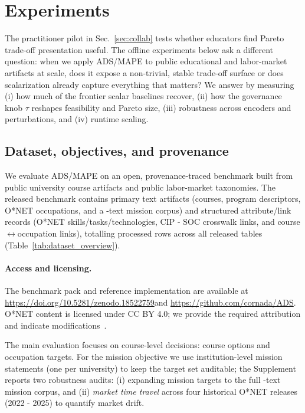 \documentclass[sigconf,review]{acmart}
\newcommand{\BenchmarkURL}{\url{https://doi.org/10.5281/zenodo.18522759}}
\newcommand{\CodeURL}{\url{https://github.com/cornada/ADS}}
\newcommand{\ADS}{\textsc{ADS}\xspace}
\newcommand{\MAPE}{\textsc{MAPE}\xspace}
\begin{document}
\section{Experiments}

\label{sec:experiments}

The practitioner pilot in Sec.~\ref{sec:collab} tests whether educators find Pareto trade-off presentation useful. The offline experiments below ask a different question: when we apply \ADS/\MAPE to public educational and labor-market artifacts at scale, does it expose a non-trivial, stable trade-off surface or does scalarization already capture everything that matters? We answer by measuring (i) how much of the frontier scalar baselines recover, (ii) how the governance knob $\tau$ reshapes feasibility and Pareto size, (iii) robustness across encoders and perturbations, and (iv) runtime scaling.

\subsection{Dataset, objectives, and provenance}
\label{subsec:data}
We evaluate \ADS/\MAPE on an open, provenance-traced benchmark built from {public university course artifacts} and {public labor-market taxonomies}. The released benchmark contains {\NumPrimaryArtifacts} primary text artifacts (\NumCourses courses, \NumPrograms program descriptors, \NumOccupations O*NET occupations, and a \NumMissionsExpanded-text mission corpus) and {\NumAttributeRecords} structured attribute/link records (O*NET skills/tasks/technologies, CIP - SOC crosswalk links, and course$\leftrightarrow$occupation links), totalling {\NumProcessedRows} processed rows across all released tables (Table~\ref{tab:dataset_overview}).

\paragraph{Access and licensing.}
The benchmark pack and reference implementation are available at \BenchmarkURL and \CodeURL.
O*NET content is licensed under CC BY 4.0; we provide the required attribution and indicate modifications~\cite{onet_license_db}.


The {main evaluation} focuses on course-level decisions: \NumCourses course options and \NumOccupations occupation targets. For the mission objective we use {\NumMissionsMain} institution-level mission statements (one per university) to keep the target set auditable; the Supplement reports two robustness audits: (i) expanding mission targets to the full \NumMissionsExpanded-text mission corpus, and (ii) \emph{market time travel} across four historical O*NET releases (2022 - 2025) to quantify market drift.
\end{document}
